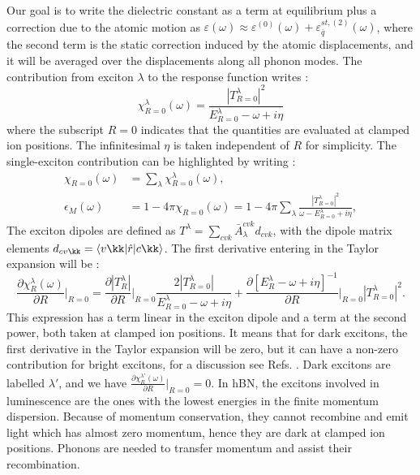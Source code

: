 Our goal is to write the dielectric constant as a term at equilibrium plus a correction due to the atomic motion as $\varepsilon (\omega)\approx \varepsilon^{(0)}(\omega) + \varepsilon^{st,(2)}_{\bar{q}}(\omega)$, where the second term is the static correction induced by the atomic displacements, and it will be averaged over the displacements along all phonon modes.\cite{zacharias2016one} 
The contribution from exciton $\lambda$ to the response function  writes :
\begin{equation}
	\chi^\lambda_{R=0}(\omega) = \frac{|T^\lambda_{R=0}|^2}{E^\lambda_{R=0} - \omega + i \eta} \label{eq:chi_R_lambda}
\end{equation}
where the subscript $R=0$ indicates that the quantities are evaluated at clamped ion positions. The infinitesimal $\eta$ is taken independent of $R$ for simplicity.
The single-exciton contribution can be highlighted by writing :
\begin{align}
	\chi_{R=0}(\omega)&= \sum_\lambda \chi^\lambda_{R=0} (\omega),  \label{eq:chi} \\
\epsilon_M(\omega)&=1 -  4\pi \chi_{R=0}(\omega) = 1 - 4\pi\sum_\lambda \frac{ | T_{R=0}^\lambda|^2}{\omega - E^\lambda_{R=0} + i\eta},
\end{align}
The exciton dipoles are defined as $T^\lambda = \sum_{cvk} \bar{A}_\lambda^{cvk} d_{cvk}$, with the dipole matrix elements $d_{cv\kk} = \langle v \kk | \hat r | c\kk \rangle$. The first derivative entering in the Taylor expansion will be :
\begin{equation}
	\frac{\partial \chi^\lambda_R(\omega)}{\partial R}\biggr|_{R=0} = \frac{\partial |T^\lambda_R|}{\partial R}\biggr|_{R=0} \frac{2|T^\lambda_{R=0}|}{E^\lambda_{R=0} - \omega + i\eta} + \frac{\partial \left[ E^\lambda_R - \omega + i\eta \right]^{-1}}{\partial R}\biggr|_{R=0} |T^\lambda_{R=0}|^2.
\end{equation}
This expression has a term linear in the exciton dipole and a term at the second power, both taken at clamped ion positions. It means that for dark excitons, the first derivative in the Taylor expansion will be zero, but it can have a non-zero contribution for bright excitons, for a discussion see Refs. \cite{zacharias2016one,zacharias2015stochastic}. Dark excitons are labelled $\lambda'$, and we have $\frac{\partial \chi^{\lambda'}_R(\omega)}{\partial R}\bigr|_{R=0} = 0$.
In \acrshort{hBN}, the excitons involved in luminescence are the ones with the lowest energies in the finite momentum dispersion. Because of momentum conservation, they cannot recombine and emit light which has almost zero momentum, hence they are dark at clamped ion positions. Phonons are needed to transfer momentum and assist their recombination. 


